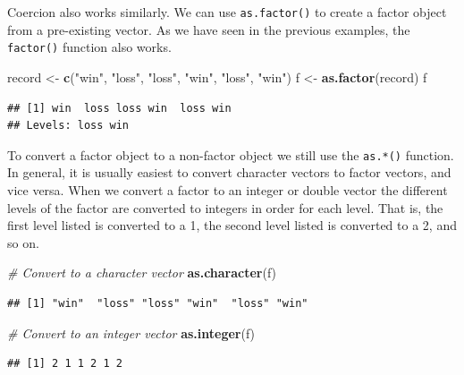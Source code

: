 \documentclass[
]{book}
\newenvironment{Shaded}{\begin{snugshade}}{\end{snugshade}}
\newcommand{\CommentTok}[1]{\textcolor[rgb]{0.56,0.35,0.01}{\textit{#1}}}
\newcommand{\KeywordTok}[1]{\textcolor[rgb]{0.13,0.29,0.53}{\textbf{#1}}}
\newcommand{\NormalTok}[1]{#1}
\newcommand{\StringTok}[1]{\textcolor[rgb]{0.31,0.60,0.02}{#1}}
\begin{document}
Coercion also works similarly. We can use \texttt{as.factor()} to create a factor object from a pre-existing vector. As we have seen in the previous examples, the \texttt{factor()} function also works.

\begin{Shaded}
\begin{Highlighting}[]
\NormalTok{record <-}\StringTok{ }\KeywordTok{c}\NormalTok{(}\StringTok{"win"}\NormalTok{, }\StringTok{"loss"}\NormalTok{, }\StringTok{"loss"}\NormalTok{, }\StringTok{"win"}\NormalTok{, }\StringTok{"loss"}\NormalTok{, }\StringTok{"win"}\NormalTok{)}
\NormalTok{f <-}\StringTok{ }\KeywordTok{as.factor}\NormalTok{(record)}
\NormalTok{f}
\end{Highlighting}
\end{Shaded}

\begin{verbatim}
## [1] win  loss loss win  loss win 
## Levels: loss win
\end{verbatim}

To convert a factor object to a non-factor object we still use the \texttt{as.*()} function. In general, it is usually easiest to convert character vectors to factor vectors, and vice versa. When we convert a factor to an integer or double vector the different levels of the factor are converted to integers in order for each level. That is, the first level listed is converted to a 1, the second level listed is converted to a 2, and so on.

\begin{Shaded}
\begin{Highlighting}[]
\CommentTok{# Convert to a character vector}
\KeywordTok{as.character}\NormalTok{(f)}
\end{Highlighting}
\end{Shaded}

\begin{verbatim}
## [1] "win"  "loss" "loss" "win"  "loss" "win"
\end{verbatim}

\begin{Shaded}
\begin{Highlighting}[]
\CommentTok{# Convert to an integer vector}
\KeywordTok{as.integer}\NormalTok{(f)}
\end{Highlighting}
\end{Shaded}

\begin{verbatim}
## [1] 2 1 1 2 1 2
\end{verbatim}
\end{document}
